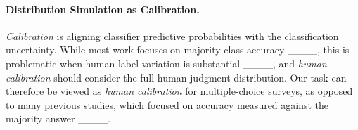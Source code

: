 \paragraph{Distribution Simulation as Calibration.}
\textit{Calibration} is aligning classifier predictive probabilities with the classification uncertainty. While most work focuses on majority class accuracy ____, this is problematic when human label variation is substantial ____, and \textit{human calibration} should consider the full human judgment distribution.
Our task can therefore be viewed as \textit{human calibration} for multiple-choice surveys, as opposed to many previous studies, which focused on accuracy measured against the majority answer ____.


